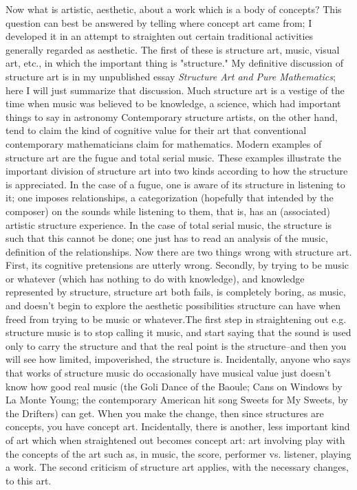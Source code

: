 \documentclass[10pt,twoside]{memoir}
\newcommand{\essaytitle}[1]{
	\emph{#1}}
\begin{document}
\begin{enumerate}
{\begin{enumerate}
\begin{sysrules}
\begin{sysrules}
\begin{sysrules}
\begin{sysrules}
{\begin{enumerate}
Now what is artistic, aesthetic, about a work which is a body of 
concepts? This question can best be answered by telling where concept art 
came from; I developed it in an attempt to straighten out certain traditional 
activities generally regarded as aesthetic. The first of these is structure art, 
music, visual art, etc., in which the important thing is "structure." My 
definitive discussion of structure art is in my unpublished essay \essaytitle{Structure 
Art and Pure Mathematics}; here I will just summarize that discussion. Much 
structure art is a vestige of the time when \eg music was believed to be 
knowledge, a science, which had important things to say in astronomy \etc
Contemporary structure artists, on the other hand, tend to claim the kind of 
cognitive value for their art that conventional contemporary mathematicians 
claim for mathematics. Modern examples of structure art are the fugue and 
total serial music. These examples illustrate the important division of 
structure art into two kinds according to how the structure is appreciated. In 
the case of a fugue, one is aware of its structure in listening to it; one 
imposes relationships, a categorization (hopefully that intended by the 
composer) on the sounds while listening to them, that is, has an (associated) 
artistic structure experience. In the case of total serial music, the structure is 
such that this cannot be done; one just has to read an analysis of the 
music, definition of the relationships. Now there are two things wrong with 
structure art. First, its cognitive pretensions are utterly wrong. Secondly, by 
trying to be music or whatever (which has nothing to do with knowledge), 
and knowledge represented by structure, structure art both fails, is 
completely boring, as music, and doesn't begin to explore the aesthetic 
possibilities structure can have when freed from trying to be music or 
whatever.The first step in straightening out e.g. structure music is to stop 
calling it music, and start saying that the sound is used only to carry the 
structure and that the real point is the structure--and then you will see how 
limited, impoverished, the structure is. Incidentally, anyone who says that 
works of structure music do occasionally have musical value just doesn't 
know how good real music (the Goli Dance of the Baoule; Cans on Windows 
by La Monte Young; the contemporary American hit song Sweets for My 
Sweets, by the Drifters) can get. When you make the change, then since 
structures are concepts, you have concept art. Incidentally, there is another, 
less important kind of art which when straightened out becomes concept art: 
art involving play with the concepts of the art such as, in music, the score, 
performer vs. listener, playing a work. The second criticism of structure art 
applies, with the necessary changes, to this art. 


\end{enumerate}}
\end{sysrules}
\end{sysrules}
\end{sysrules}
\end{sysrules}
\end{enumerate}}
\end{enumerate}
\end{document}
